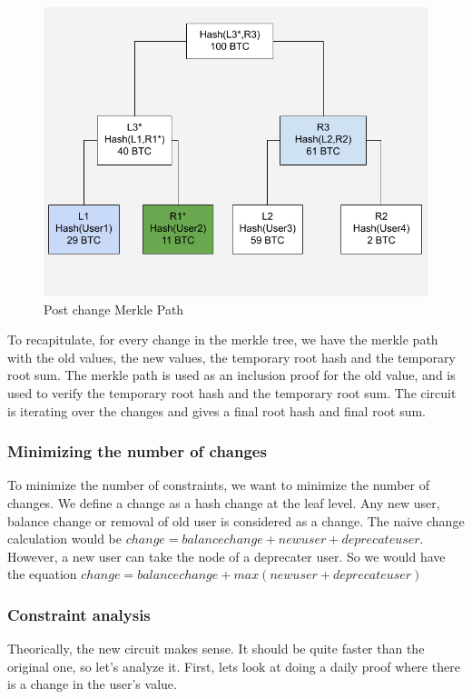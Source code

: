          \begin{figure}[H]
            \centering
            \includegraphics[width=130mm]{MerklePathTemp.png}
            \caption{Post change Merkle Path}
            \label{overflow}
            \end{figure}

To recapitulate, for every change in the merkle tree, we have the merkle path with the old values, the new values, the temporary root hash and
the temporary root sum.
The merkle path is used as an inclusion proof for the old value, and is used to verify the temporary root hash and the temporary root sum.
The circuit is iterating over the changes and gives a final root hash and final root sum.

\subsubsection{Minimizing the number of changes}
To minimize the number of constraints, we want to minimize the number of changes.
We define a change as a hash change at the leaf level. Any new user, balance change or removal of old user is considered as a change.
The naive change calculation would be $change = balance change + new user + deprecate user$.
However, a new user can take the node of a deprecater user. So we would have the equation $change = balance change +max(new user + deprecate user)$

\subsubsection{Constraint analysis}
Theorically, the new circuit makes sense. It should be quite faster than the original one, so let's analyze it.
First, lets look at doing a daily proof where there is a change in the user's value.

